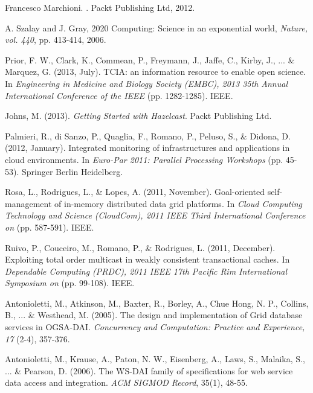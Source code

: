 \documentclass[conference]{IEEEtran}
\begin{document}
\begin{thebibliography}{1}
	\scriptsize{
		
Francesco Marchioni.
.
\newblock Packt Publishing Ltd, 2012.

 A. Szalay and J. Gray, 2020 Computing: Science in an exponential world, {\em Nature, vol. 440}, pp. 413-414, 2006.

Prior, F. W., Clark, K., Commean, P., Freymann, J., Jaffe, C., Kirby, J., ... \& Marquez, G. (2013, July). TCIA: an information resource to enable open science. In {\em Engineering in Medicine and Biology Society (EMBC), 2013 35th Annual International Conference of the IEEE} (pp. 1282-1285). IEEE.

 Johns, M. (2013). {\em Getting Started with Hazelcast}. Packt Publishing Ltd.

 Palmieri, R., di Sanzo, P., Quaglia, F., Romano, P., Peluso, S., \& Didona, D. (2012, January). Integrated monitoring of infrastructures and applications in cloud environments. In {\em Euro-Par 2011: Parallel Processing Workshops} (pp. 45-53). Springer Berlin Heidelberg.

Rosa, L., Rodrigues, L., \& Lopes, A. (2011, November). Goal-oriented self-management of in-memory distributed data grid platforms. In {\em Cloud Computing Technology and Science (CloudCom), 2011 IEEE Third International Conference on} (pp. 587-591). IEEE.

 Ruivo, P., Couceiro, M., Romano, P., \& Rodrigues, L. (2011, December). Exploiting total order multicast in weakly consistent transactional caches. In {\em Dependable Computing (PRDC), 2011 IEEE 17th Pacific Rim International Symposium on} (pp. 99-108). IEEE.

 Antonioletti, M., Atkinson, M., Baxter, R., Borley, A., Chue Hong, N. P., Collins, B., ... \& Westhead, M. (2005). The design and implementation of Grid database services in OGSA-DAI. {\em  Concurrency and Computation: Practice and Experience, 17} (2-4), 357-376.

 Antonioletti, M., Krause, A., Paton, N. W., Eisenberg, A., Laws, S., Malaika, S., ... \& Pearson, D. (2006). The WS-DAI family of specifications for web service data access and integration. {\em ACM SIGMOD Record}, 35(1), 48-55.
}
\end{thebibliography}
\end{document}
